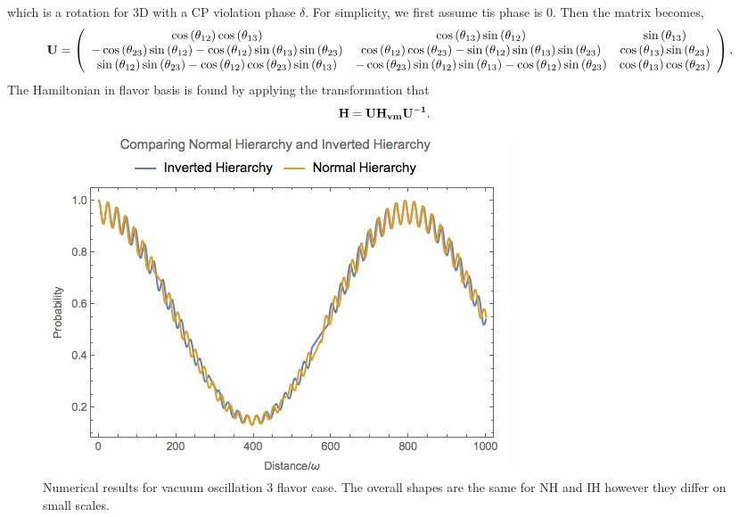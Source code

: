 \documentclass[letterpaper,12pt,english]{sphinxmanual}
\begin{document}
which is a rotation for 3D with a CP violation phase \(\delta\). For simplicity, we first assume tis phase is 0. Then the matrix becomes,
\begin{gather}
\begin{split}\mathbf{U} = \left(
\begin{array}{ccc}
 \cos \left(\theta _{12}\right) \cos \left(\theta _{13}\right) & \cos \left(\theta _{13}\right) \sin \left(\theta _{12}\right) & \sin \left(\theta _{13}\right) \\
 -\cos \left(\theta _{23}\right) \sin \left(\theta _{12}\right)-\cos \left(\theta _{12}\right) \sin \left(\theta _{13}\right) \sin \left(\theta _{23}\right) & \cos \left(\theta _{12}\right) \cos \left(\theta _{23}\right)-\sin \left(\theta _{12}\right) \sin \left(\theta _{13}\right) \sin \left(\theta _{23}\right) & \cos \left(\theta _{13}\right) \sin \left(\theta _{23}\right) \\
 \sin \left(\theta _{12}\right) \sin \left(\theta _{23}\right)-\cos \left(\theta _{12}\right) \cos \left(\theta _{23}\right) \sin \left(\theta _{13}\right) & -\cos \left(\theta _{23}\right) \sin \left(\theta _{12}\right) \sin \left(\theta _{13}\right)-\cos \left(\theta _{12}\right) \sin \left(\theta _{23}\right) & \cos \left(\theta _{13}\right) \cos \left(\theta _{23}\right) \\
\end{array}
\right).\end{split}\notag
\end{gather}
The Hamiltonian in flavor basis is found by applying the transformation that
\begin{gather}
\begin{split}\mathbf{H} &= \mathbf{U} \mathbf{H_{vm}} \mathbf{U^{-1}}.\end{split}\notag
\end{gather}\begin{figure}[htbp]
\centering
\capstart

\includegraphics{vacOsc3Flavor.jpg}
\caption{Numerical results for vacuum oscillation 3 flavor case. The overall shapes are the same for NH and IH however they differ on small scales.}\end{figure}
\end{document}
